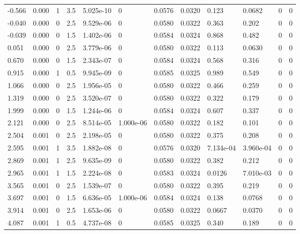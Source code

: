 \documentclass[preview]{standalone}
\begin{document}
{{\begin{tabular}{L{1.2cm}C{1.2cm} C{0.3cm}C{0.5cm} C{1.4cm}C{1.4cm} C{1.4cm}C{1.4cm} C{1.6cm}C{1.6cm} C{1.6cm}C{1.6cm}}
  -0.566  &  0.000  & 1     & 3.5 &  5.025e-10  & 0  &  0.0576&   0.0320& 0.123 & 0.0682   &  0 & 0  \\ 
  -0.040  &  0.000  & 0     & 2.5 &  9.529e-06  & 0  &  0.0580&   0.0322& 0.363 & 0.202   &  0 & 0  \\ 
  -0.039  &  0.000  & 0     & 1.5 &  1.402e-06  & 0  &  0.0584&   0.0324& 0.868 & 0.482   &  0 & 0  \\ 
  0.051  &  0.000  & 0     & 2.5 &  3.779e-06  & 0  &  0.0580&   0.0322& 0.113 & 0.0630   &  0 & 0  \\ 
  0.670  &  0.000  & 0     & 1.5 &  2.343e-07  & 0  &  0.0584&   0.0324& 0.568 & 0.316   &  0 & 0  \\ 
  0.915  &  0.000  & 1     & 0.5 &  9.945e-09  & 0  &  0.0585&   0.0325& 0.989 & 0.549   &  0 & 0  \\ 
  1.066  &  0.000  & 0     & 2.5 &  1.956e-05  & 0  &  0.0580&   0.0322& 0.466 & 0.259   &  0 & 0  \\ 
  1.319  &  0.000  & 0     & 2.5 &  3.520e-07  & 0  &  0.0580&   0.0322& 0.322 & 0.179   &  0 & 0  \\ 
  1.999  &  0.000  & 0     & 1.5 &  1.244e-06  & 0  &  0.0584&   0.0324& 0.607 & 0.337   &  0 & 0  \\ 
  2.121  &  0.000  & 0     & 2.5 &  8.514e-05  & 1.000e-06  &  0.0580&   0.0322& 0.182 & 0.101   &  0 & 0  \\ 
  2.504  &  0.001  & 0     & 2.5 &  2.198e-05  & 0  &  0.0580&   0.0322& 0.375 & 0.208   &  0 & 0  \\ 
  2.595  &  0.001  & 1     & 3.5 &  1.882e-08  & 0  &  0.0576&   0.0320& 7.134e-04 & 3.960e-04   &  0 & 0  \\ 
  2.869  &  0.001  & 1     & 2.5 &  9.635e-09  & 0  &  0.0580&   0.0322& 0.382 & 0.212   &  0 & 0  \\ 
  2.965  &  0.001  & 1     & 1.5 &  2.224e-08  & 0  &  0.0583&   0.0324& 0.0126 & 7.010e-03   &  0 & 0  \\ 
  3.565  &  0.001  & 0     & 2.5 &  1.539e-07  & 0  &  0.0580&   0.0322& 0.395 & 0.219   &  0 & 0  \\ 
  3.697  &  0.001  & 0     & 1.5 &  6.636e-05  & 1.000e-06  &  0.0584&   0.0324& 0.138 & 0.0768   &  0 & 0  \\ 
  3.914  &  0.001  & 0     & 2.5 &  1.653e-06  & 0  &  0.0580&   0.0322& 0.0667 & 0.0370   &  0 & 0  \\ 
  4.087  &  0.001  & 1     & 0.5 &  4.737e-08  & 0  &  0.0585&   0.0325& 0.340 & 0.189   &  0 & 0  \\ 

\end{tabular}}}
\end{document}
